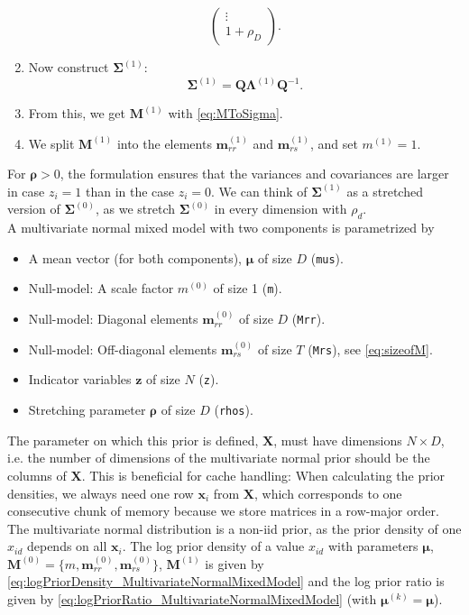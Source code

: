 \documentclass[a4paper,11pt]{article}
\def\M{\boldsymbol{M}}
\def\Q{\boldsymbol{Q}}
\def\X{\boldsymbol{X}}
\def\x{\boldsymbol{x}}
\def\z{\boldsymbol{z}}
\def\bmrr{\boldsymbol m_{rr}}
\def\bmrs{\boldsymbol m_{rs}}
\def\bmu{\boldsymbol{\mu}}
\def\brho{\boldsymbol{\rho}}
\def\bSigma{\boldsymbol{\Sigma}}
\def\bLambda{\boldsymbol{\Lambda}}
\newcommand{\privparam}[1]{\texttt{\textunderscore #1}}
\begin{document}
\begin{enumerate}
\begin{equation*}
\begin{pmatrix}
      \vdots\\
      1 + \rho_{D}
      \end{pmatrix}.
     \end{equation*}
     \item Now construct $\bSigma^{(1)}$:
     \begin{equation}\label{eq:getSigma1}
         \bSigma^{(1)} = \Q \bLambda^{(1)} \Q^{-1}.
     \end{equation}
     \item From this, we get $\M^{(1)}$ with \eqref{eq:MToSigma}.
     \item We split $\M^{(1)}$ into the elements $\bmrr^{(1)}$ and $\bmrs^{(1)}$, and set $m^{(1)} = 1$.
\end{enumerate}
For $\brho > 0$, the formulation ensures that the variances and covariances are larger in case $z_i = 1$ than in the case $z_i = 0$. We can think of $\bSigma^{(1)}$ as a stretched version of $\bSigma^{(0)}$, as we stretch $\bSigma^{(0)}$ in every dimension with $\rho_d$.\\
A multivariate normal mixed model with two components is parametrized by
\begin{itemize}
  \item A mean vector (for both components), $\bmu$ of size $D$ (\privparam{mus}).
  \item Null-model: A scale factor $m^{(0)}$ of size 1 (\privparam{m}).
  \item Null-model: Diagonal elements $\bmrr^{(0)}$ of size $D$ (\privparam{Mrr}).
  \item Null-model: Off-diagonal elements $\bmrs^{(0)}$ of size $T$ (\privparam{Mrs}), see \eqref{eq:sizeofM}.
  \item Indicator variables $\z$ of size $N$ (\privparam{z}).
  \item Stretching parameter $\brho$ of size $D$ (\privparam{rhos}).
\end{itemize}

The parameter on which this prior is defined, $\X$, must have dimensions $N \times D$, i.e. the number of dimensions of the multivariate normal prior should be the columns of $\X$. This is beneficial for cache handling: When calculating the prior densities, we always need one row  $\x_i$ from $\X$, which corresponds to one consecutive chunk of memory because we store matrices in a row-major order.\\
The multivariate normal distribution is a non-iid prior, as the prior density of one $x_{id}$ depends on all $\x_i$. The log prior density of a value $x_{id}$ with parameters $\bmu$, $\M^{(0)} = \{m, \bmrr^{(0)}, \bmrs^{(0)}\}$, $\M^{(1)}$ is given by \eqref{eq:logPriorDensity_MultivariateNormalMixedModel} and the log prior ratio is given by \eqref{eq:logPriorRatio_MultivariateNormalMixedModel} (with $\bmu^{(k)} = \bmu$).
\end{document}
